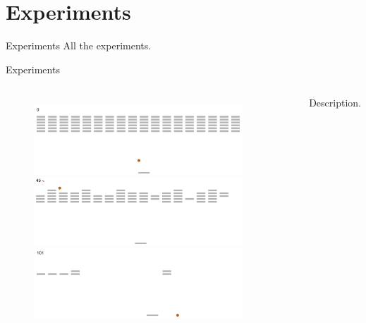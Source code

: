 \section{Experiments}

\begin{frame}{Experiments}
    All the experiments.
\end{frame}

\begin{frame}{Experiments}
    \begin{columns}[c,onlytextwidth]
            \begin{figure}
                \includegraphics[width=0.9\textwidth]{images/pygame-sequence-0.png}
                \includegraphics[width=0.9\textwidth]{images/pygame-sequence-1.png}
                \includegraphics[width=0.9\textwidth]{images/pygame-sequence-2.png}
            \end{figure}
            Description.
    \end{columns}
\end{frame}

